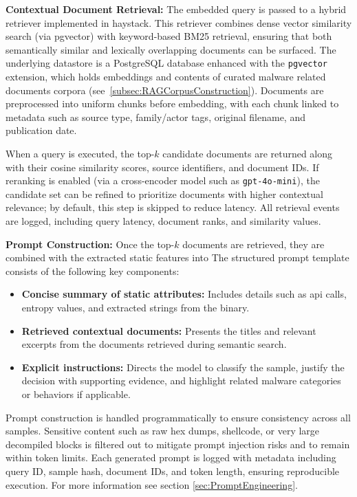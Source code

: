 \vspace{0.5em}
\noindent\textbf{Contextual Document Retrieval:}
The embedded query is passed to a hybrid retriever implemented in \gls{haystack}. This retriever
combines dense vector similarity search (via \gls{pgvector}) with keyword-based BM25 retrieval,
ensuring that both semantically similar and lexically overlapping documents can be surfaced.
The underlying datastore is a PostgreSQL database enhanced with the \texttt{pgvector} extension,
which holds embeddings and contents of curated malware related documents corpora
(see~\ref{subsec:RAGCorpusConstruction}). Documents are preprocessed into uniform chunks before
embedding, with each chunk linked to metadata such as source type, family/actor tags, original
filename, and publication date.

When a query is executed, the top-$k$ candidate documents are returned along with their cosine
similarity scores, source identifiers, and document IDs. If reranking is enabled (via a
cross-encoder model such as \texttt{gpt-4o-mini}), the candidate set can be refined to prioritize
documents with higher contextual relevance; by default, this step is skipped to reduce latency. All
retrieval events are logged, including query latency, document ranks, and similarity values.

\vspace{0.5em}
\noindent\textbf{Prompt Construction:}
Once the top-$k$ documents are retrieved, they are combined with the extracted static features into
The structured prompt template consists of the following key components:
\begin{itemize}
      \item \textbf{Concise summary of static attributes:} Includes details such
            as \gls{api} calls, entropy values, and extracted strings from the binary.
      \item \textbf{Retrieved contextual documents:} Presents the titles and
            relevant excerpts from the documents retrieved during semantic search.
      \item \textbf{Explicit instructions:} Directs the model to classify the
            sample, justify the decision with supporting evidence, and highlight
            related malware categories or behaviors if applicable.
\end{itemize}
Prompt construction is handled programmatically to ensure consistency across all samples. Sensitive
content such as raw hex dumps, shellcode, or very large decompiled blocks is filtered out to
mitigate prompt injection risks and to remain within token limits. Each generated prompt is logged
with metadata including query ID, sample hash, document IDs, and token length, ensuring reproducible
execution. For more information see section \ref{sec:PromptEngineering}.

